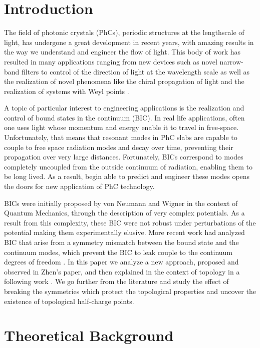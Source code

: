 \section{Introduction}

The field of photonic crystals (PhCs), periodic structures at the lengthscale of light, has undergone a great development in recent years, with amazing results in the way we understand and engineer the flow of light. This body of work has resulted in many applications ranging from new devices such as novel narrow-band filters to control of the direction of light at the wavelength scale 
\cite{D.Joannopoulos2008}  as well as the realization of novel phenomena like the chiral propagation of light \cite{Wang2009} and the realization of systems with Weyl points \cite{Lu2013, Lu2015}.

A topic of particular interest to engineering applications is the realization and control of bound states in the continuum (BIC). In real life applications, often one uses light whose momentum and energy enable it to travel in free-space. Unfortunately, that means that resonant modes in PhC slabs are capable to couple to free space radiation modes and decay over time, preventing their propagation over very large distances. Fortunately, BICs correspond to modes completely uncoupled from the outside continuum of radiation, enabling them to be long lived. As a result, begin able to predict and engineer these modes opens the doors for new application of PhC technology.

BICs were initially proposed by von Neumann and Wigner \cite{von1929unusual} in the context of Quantum Mechanics, through the description of very complex potentials. As a result from this complexity, these BIC were not robust under perturbations of the potential making them experimentally elusive. More recent work had analyzed BIC that arise from a symmetry mismatch between the bound state and the continuum modes, which prevent the BIC to leak couple to the continuum degrees of freedom \cite{Evans2006, Rivera2015}. In this paper we analyze a new approach, proposed and observed in Zhen's paper, and then explained in the context of topology in a following work  \cite{Zhen2014, hSU2013}. We go further from the literature and study the effect of breaking the symmetries which protect the topological properties and uncover the existence of topological half-charge points.


\section{Theoretical Background}
\label{sec:sym}

